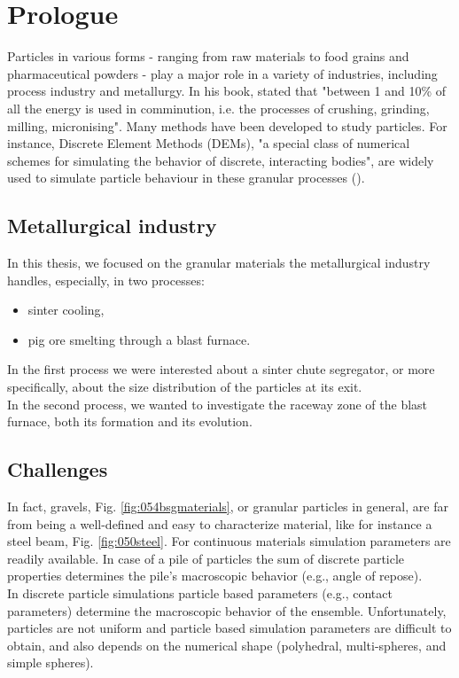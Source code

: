 
\chapter{Prologue}
\label{cap:prologue}

Particles in various forms - ranging from raw materials to food grains and pharmaceutical powders - 
play a major role in a variety of industries, including process industry and metallurgy. 
In his book, \citet{RefWorks:117} stated that "between 1 and 10\% of all the energy is used in 
comminution, i.e. the processes of crushing, grinding, milling, micronising". 
Many methods have been developed to study particles.
For instance, Discrete Element Methods (\acs{DEMs}), "a special class of numerical
schemes for simulating the behavior of discrete, interacting bodies", are widely used to 
simulate particle behaviour in these granular processes
(\citet{RefWorks:130}).\\ 

\section{Metallurgical industry}
\label{sec:metallurgical industry}
In this thesis, we focused on the granular materials the metallurgical industry
handles, especially, in two processes:
\begin{itemize}
  \item{sinter cooling,}
  \item{pig ore smelting through a blast furnace.} 
\end{itemize} 

In the first process we were interested about a sinter chute
segregator, or more specifically, about the size distribution of the particles
at its exit.\\
In the second process, we wanted to investigate the raceway zone of the blast
furnace, both its formation and its evolution.

\section{Challenges}
\label{sec:challenges}



In fact, gravels, Fig. \ref{fig:054bsgmaterials}, or granular particles in
general, are far from being a well-defined and easy to characterize material,
like for instance a steel beam, Fig.
\ref{fig:050steel}. For continuous materials simulation
parameters are readily available.
In case of a pile of particles the sum of discrete particle properties determines the pile's macroscopic behavior 
(e.g., angle of repose).\\
In discrete particle simulations particle based parameters (e.g., contact
parameters) determine the macroscopic behavior of the ensemble.
Unfortunately, particles are not uniform and particle based simulation
parameters are difficult to obtain, and also depends on the numerical shape
(polyhedral, multi-spheres, and simple spheres).

